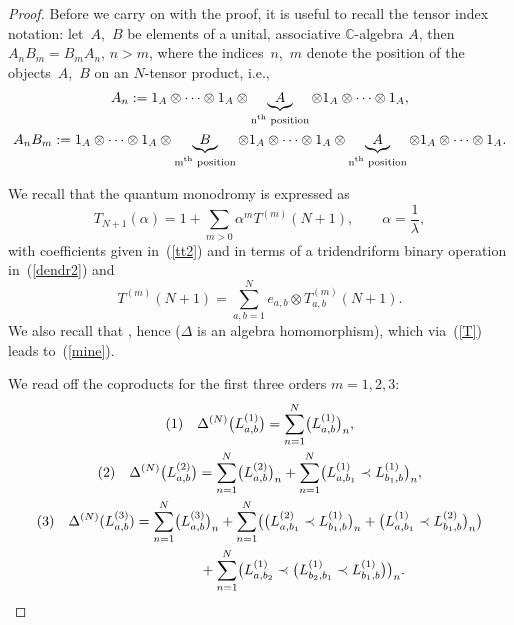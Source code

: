 \documentclass[10pt,a4paper]{amsart}
\numberwithin{equation}{section}
\theoremstyle{definition}
\newcommand{\id}{\operatorname{id}}
\def\mathfrak#1{#1}%
\def\mathcal#1{#1}%
\begin{document}
\begin{proof}
Before we carry on with the proof, it is useful to recall the tensor index notation: let~$A$,~$B$ be elements of a unital, associative ${\mathbb C}$-algebra
${\mathfrak A}$, then $A_n B_m = B_m A_n$, $n>m$, where the indices~$n$,~$m$ denote the position of the objects~$A$,~$B$ on an $N$-tensor product, i.e.,
\begin{gather}
 A_n := 1_{\mathfrak A} \otimes \dots\otimes 1_{\mathfrak A}\otimes \underbrace{A}_{\text{n$^{\rm th}$ position}} \otimes 1_{\mathfrak A}\otimes \dots \otimes 1_{\mathfrak A}, \label{nota}\\
 A_n B_m :=1_{\mathfrak A} \otimes \dots\otimes 1_{\mathfrak A}\otimes \underbrace{B}_{\text{m$^{\rm th}$ position}} \otimes 1_{\mathfrak A}\otimes \dots\otimes 1_{\mathfrak A} \otimes \underbrace{A}_{\text{n$^{\rm th}$ position}} \otimes 1_{\mathfrak A} \otimes\dots \otimes 1_{\mathfrak A}.\nonumber%
\end{gather}

We recall that the quantum monodromy is expressed as
\[
T_{N+1}(\alpha)\! =\! 1 + \sum_{m>0} \alpha^m T^{(m)}(N+1) , \qquad \alpha = \frac{1}{\lambda},
\]
 with coefficients given in~(\ref{tt2}) and in terms of a tridendriform binary operation in~(\ref{dendr2}) and
 \[
 T^{(m)}(N+1) = \sum_{a,b =1}^{{\mathcal N}} e_{a,b} \otimes T_{a,b}^{(m)}(N+1).
 \]
 We also recall that \smash{$T_{N+1}(\lambda)= \bigl(\id \otimes \Delta^{(N)}\bigr){\mathbb L}(\lambda)$}, hence  ($\Delta$ is an algebra homomorphism), which via~(\ref{T}) leads to~(\ref{mine}).

We read off the coproducts for the first three orders $m=1,2,3$:
\begin{gather*}
(1) \quad \displaystyle\Delta^{(N)}\bigl(L^{(1)}_{a,b}\bigr) = \sum_{n=1}^N \bigl(L^{(1)}_{a,b}\bigr)_n ,\\
 (2) \quad \Delta^{(N)}\bigl(L^{(2)}_{a,b}\bigr) = \sum_{n=1}^N \bigl(L^{(2)}_{a,b}\bigr)_n + \sum_{n=1}^N \bigl( L^{(1)}_{a,b_1} \prec L^{(1)}_{b_1, b} \bigr)_n,\\
(3) \quad \Delta^{(N)}(L^{(3)}_{a,b}) = \sum_{n=1}^N \bigl(L^{(3)}_{a,b}\bigr)_n + \sum_{n=1}^N \bigl( \bigl( L^{(2)}_{a,b_1} \prec L^{(1)}_{b_1, b} \bigr)_n+ \bigl( L^{(1)}_{a,b_1} \prec L^{(2)}_{b_1, b} \bigr)_n\bigr)\\ \hphantom{(3) \quad \Delta^{(N)}(L^{(3)}_{a,b}) =}{} + \sum_{n=1}^N \bigl( L^{(1)}_{a,b_2} \prec \bigl(L^{(1)}_{b_2, b_1} \prec L^{(1)}_{b_1, b} \bigr)\bigr)_n .\tag*{\qed}
\end{gather*}
\renewcommand{\qed}{}
\end{proof}
\end{document}
